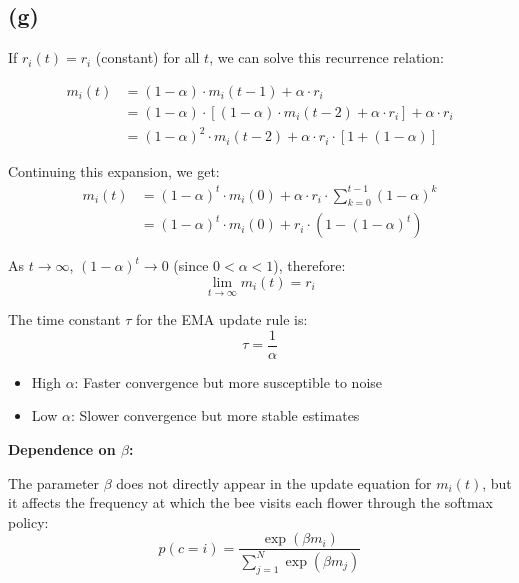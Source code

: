\documentclass{article}
\begin{document}
\subsection*{(g)}


If $r_i(t) = r_i$ (constant) for all $t$, we can solve this recurrence relation:

\begin{align}
m_i(t) &= (1-\alpha) \cdot m_i(t-1) + \alpha \cdot r_i\\
&= (1-\alpha) \cdot [(1-\alpha) \cdot m_i(t-2) + \alpha \cdot r_i] + \alpha \cdot r_i\\
&= (1-\alpha)^2 \cdot m_i(t-2) + \alpha \cdot r_i \cdot [1 + (1-\alpha)]
\end{align}

Continuing this expansion, we get:
\begin{align}
m_i(t) &= (1-\alpha)^t \cdot m_i(0) + \alpha \cdot r_i \cdot \sum_{k=0}^{t-1} (1-\alpha)^k\\
&= (1-\alpha)^t \cdot m_i(0) + r_i \cdot (1-(1-\alpha)^t)
\end{align}

As $t \rightarrow \infty$, $(1-\alpha)^t \rightarrow 0$ (since $0 < \alpha < 1$), therefore:
\begin{equation}
\lim_{t \rightarrow \infty} m_i(t) = r_i
\end{equation}



The time constant $\tau$ for the EMA update rule is:
\begin{equation}
\tau = \frac{1}{\alpha}
\end{equation}

\begin{itemize}
    \item High $\alpha$: Faster convergence but more susceptible to noise
    \item Low $\alpha$: Slower convergence but more stable estimates
\end{itemize}

\textbf{Dependence on $\beta$:}

The parameter $\beta$ does not directly appear in the update equation for $m_i(t)$, but it affects the frequency at which the bee visits each flower through the softmax policy:
\begin{equation}
p(c = i) = \frac{\exp(\beta m_i)}{\sum_{j=1}^{N} \exp(\beta m_j)}
\end{equation}
\end{document}

